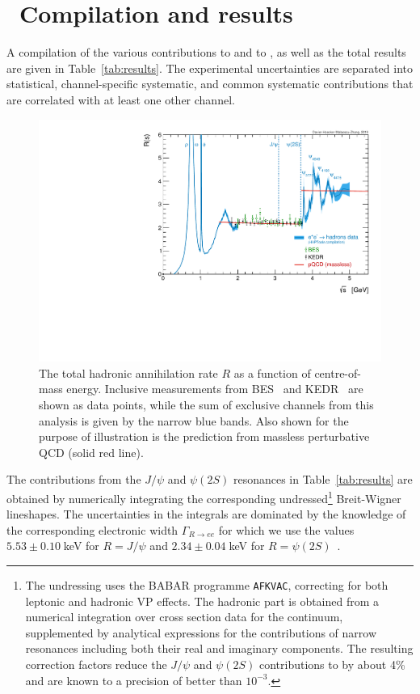 \section{~Compilation and results}
\label{sec:Results}



A compilation of the various contributions to \amuhadLO and to \dahadZ, as well as the total 
results are given in Table~\ref{tab:results}. The experimental uncertainties are separated
into statistical, channel-specific systematic, and common systematic contributions
that are correlated with at least one other channel. 
\begin{figure}[t]
  \centering
  \includegraphics[width=12.5cm]{Figures/R.pdf}
  \vspace{0.2cm}
  \caption{
             The total hadronic \ee annihilation rate $R$ as a function of centre-of-mass energy. Inclusive measurements from BES~\cite{besR}  
             and KEDR~\cite{kedr-r-1,kedr-r-2} are shown as data points,
             while the sum of exclusive channels from this analysis is given by the narrow blue bands. Also shown for the purpose of illustration is the prediction from massless perturbative QCD (solid red line). 
}
  \label{fig:R}
\end{figure}
The contributions from the $J/\psi$ and $\psi(2S)$ resonances in Table~\ref{tab:results} are obtained by numerically integrating the corresponding undressed\footnote{The undressing uses the BABAR programme {\tt AFKVAC}, correcting for both leptonic  and hadronic VP effects. The hadronic part is obtained from a numerical integration over cross section data for the continuum, supplemented by analytical expressions for the contributions of narrow resonances including both their real and imaginary components. The resulting correction factors reduce the $J/\psi$ and $\psi(2S)$ contributions to \amuhadLO by about 4\% and are known to a precision of better than $10^{-3}$.} Breit-Wigner lineshapes. The uncertainties in the integrals are dominated by the knowledge of the corresponding electronic width $\Gamma_{R\to ee}$ 
for which we use the values $5.53 \pm 0.10\;$keV for $R=J/\psi$ and $2.34 \pm 0.04\;$keV for $R=\psi(2S)$~\cite{pdg}.

